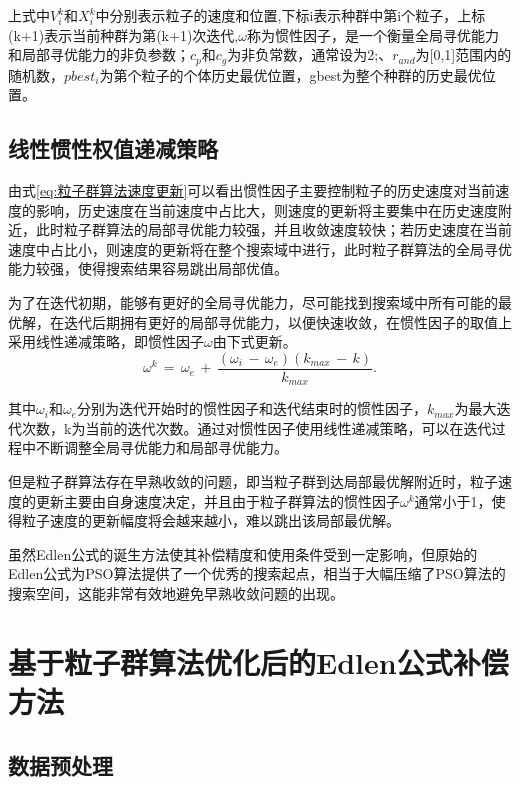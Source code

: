 上式中\(V^{k}_i\)和\( X^{k}_i\)中分别表示粒子的速度和位置,下标i表示种群中第i个粒子，上标(k+1)表示当前种群为第(k+1)次迭代,\(\omega\)称为惯性因子，是一个衡量全局寻优能力和局部寻优能力的非负参数；\(c_p\)和\(c_g\)为非负常数，通常设为2;、\(r_{and}\)为[0,1]范围内的随机数，\(pbest_i\)为第个粒子的个体历史最优位置，gbest为整个种群的历史最优位置。
\subsection{线性惯性权值递减策略}
由式\eqref{eq:粒子群算法速度更新}可以看出惯性因子主要控制粒子的历史速度对当前速度的影响，历史速度在当前速度中占比大，则速度的更新将主要集中在历史速度附近，此时粒子群算法的局部寻优能力较强，并且收敛速度较快；若历史速度在当前速度中占比小，则速度的更新将在整个搜索域中进行，此时粒子群算法的全局寻优能力较强，使得搜索结果容易跳出局部优值。

为了在迭代初期，能够有更好的全局寻优能力，尽可能找到搜索域中所有可能的最优解，在迭代后期拥有更好的局部寻优能力，以便快速收敛，在惯性因子的取值上采用线性递减策略\cite{冯浩2015一种改进的粒子群优化算法惯性权值递减策略}，即惯性因子\(\omega\)由下式更新。
\begin{equation}\label{eq:omega更新公式}
  \omega^k\,=\,\omega_e\,+\,\frac{(\omega_i\,-\,\omega_e)(k_{max}\,-\,k)}{k_{max}}.
  \end{equation}

其中\(\omega_i\)和\(\omega_e\)分别为迭代开始时的惯性因子和迭代结束时的惯性因子，\(k_{max}\)为最大迭代次数，k为当前的迭代次数。通过对惯性因子使用线性递减策略，可以在迭代过程中不断调整全局寻优能力和局部寻优能力。

但是粒子群算法存在早熟收敛的问题，即当粒子群到达局部最优解附近时，粒子速度的更新主要由自身速度决定，并且由于粒子群算法的惯性因子\(\omega^k\)通常小于1，使得粒子速度的更新幅度将会越来越小，难以跳出该局部最优解\cite{范培蕾2009克服早熟收敛现象的粒子群优化算法}。

虽然Edlen公式的诞生方法使其补偿精度和使用条件受到一定影响，但原始的Edlen公式为PSO算法提供了一个优秀的搜索起点，相当于大幅压缩了PSO算法的搜索空间，这能非常有效地避免早熟收敛问题的出现。

\section{基于粒子群算法优化后的Edlen公式补偿方法}
\subsection{数据预处理}

